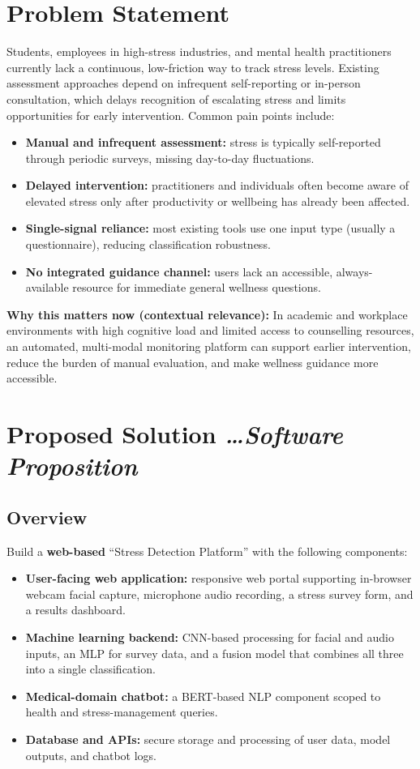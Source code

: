 \documentclass[11pt,a4paper]{article}
\newcommand{\BvrHint}[1]{%
  {\normalfont\normalsize\itshape\hfill #1}}
\begin{document}
\section{Problem Statement}
Students, employees in high-stress industries, and mental health practitioners currently lack a continuous, low-friction way to track stress levels. Existing assessment approaches depend on infrequent self-reporting or in-person consultation, which delays recognition of escalating stress and limits opportunities for early intervention. Common pain points include:
\begin{itemize}[leftmargin=0.7cm]
    \item \textbf{Manual and infrequent assessment:} stress is typically self-reported through periodic surveys, missing day-to-day fluctuations.
    \item \textbf{Delayed intervention:} practitioners and individuals often become aware of elevated stress only after productivity or wellbeing has already been affected.
    \item \textbf{Single-signal reliance:} most existing tools use one input type (usually a questionnaire), reducing classification robustness.
    \item \textbf{No integrated guidance channel:} users lack an accessible, always-available resource for immediate general wellness questions.
\end{itemize}

\textbf{Why this matters now (contextual relevance):} In academic and workplace environments with high cognitive load and limited access to counselling resources, an automated, multi-modal monitoring platform can support earlier intervention, reduce the burden of manual evaluation, and make wellness guidance more accessible.

\section{Proposed Solution %
\BvrHint{\ldots Software Proposition}}
\subsection{Overview}
Build a \textbf{web-based} ``Stress Detection Platform'' with the following components:
\begin{itemize}[leftmargin=0.7cm]
    \item \textbf{User-facing web application:} responsive web portal supporting in-browser webcam facial capture, microphone audio recording, a stress survey form, and a results dashboard.
    \item \textbf{Machine learning backend:} CNN-based processing for facial and audio inputs, an MLP for survey data, and a fusion model that combines all three into a single classification.
    \item \textbf{Medical-domain chatbot:} a BERT-based NLP component scoped to health and stress-management queries.
    \item \textbf{Database and APIs:} secure storage and processing of user data, model outputs, and chatbot logs.
\end{itemize}
\end{document}
